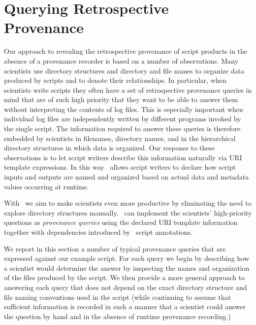 
\section{Querying Retrospective Provenance} 
\label{sec:queries}

Our approach to revealing the retrospective provenance of script
products in the absence of a provenance recorder is based on a number
of observations. Many scientists use directory structures and
directory and file names to organize data produced by scripts and to
denote their relationships. In particular, when scientists write
scripts they often have a set of retrospective provenance queries in
mind that are of such high priority that they want to be able to
answer them without interpreting the contents of log files. This is
especially important when individual log files are independently
written by different programs invoked by the single script.  The
information required to answer these queries is therefore embedded by
scientists in filenames, directory names, and in the hierarchical
directory structures in which data is organized.  Our response to
these observations is to let script writers describe this information
naturally via URI template expressions. In this way \YW\ allows script
writers to declare how script inputs and outputs are named and
organized based on actual data and metadata values occurring at
runtime.

With \YW\ we aim to make scientists even more productive by
eliminating the need to explore directory structures manually.  \yw\
can implement the scientists' high-priority questions as
\emph{provenance queries} using the declared URI template information
together with dependencies introduced by \YW\ script annotations.


We report in this section a number of typical provenance queries that
are expressed against our example script. For each query we begin by
describing how a scientist would determine the answer by inspecting
the names and organization of the files produced by the script. We
then provide a more general approach to answering each query that does
not depend on the exact directory structure and file naming
conventions used in the script (while continuing to assume that
sufficient information is recorded in such a manner that a scientist
could answer the question by hand and in the absence of runtime
provenance recording.)

